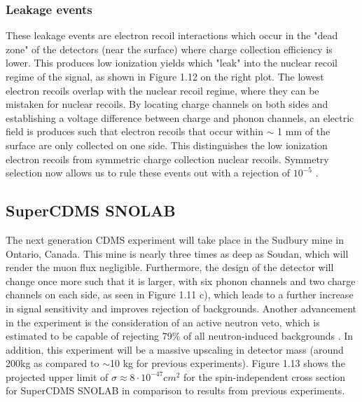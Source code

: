 \documentclass{report}
\begin{document}
\subsubsection{Leakage events}

These leakage events are electron recoil interactions which occur in the "dead zone" of the detectors (near the surface) where charge collection efficiency is lower. This produces low ionization yields which "leak" into the nuclear recoil regime of the signal, as shown in Figure 1.12 on the right plot. The lowest electron recoils overlap with the nuclear recoil regime, where they can be mistaken for nuclear recoils. By locating charge channels on both sides and establishing a voltage difference between charge and phonon channels, an electric field is produces such that electron recoils that occur within $\sim$ 1 mm of the surface are only collected on one side. This distinguishes the low ionization electron recoils from symmetric charge collection nuclear recoils. Symmetry selection now allows us to rule these events out with a rejection of $10^{-5}$ \cite{Saab2012}.

\subsection{SuperCDMS SNOLAB}

The next generation CDMS experiment will take place in the Sudbury mine in Ontario, Canada. This mine is nearly three times as deep as Soudan, which will render the muon flux negligible. Furthermore, the design of the detector will change once more such that it is larger, with six phonon channels and two charge channels on each side, as seen in Figure 1.11 c), which leads to a further increase in signal sensitivity and improves rejection of backgrounds. Another advancement in the experiment is the consideration of an active neutron veto, which is estimated to be capable of rejecting 79\% of all neutron-induced backgrounds \cite{DOE}. In addition, this experiment will be a massive upscaling in detector mass (around 200kg as compared to $\sim$10 kg for previous experiments). Figure 1.13 shows the projected upper limit of $\sigma \approx 8 \cdot 10^{-47} cm^2$ for the spin-independent cross section for SuperCDMS SNOLAB in comparison to results from previous experiments.
\end{document}

